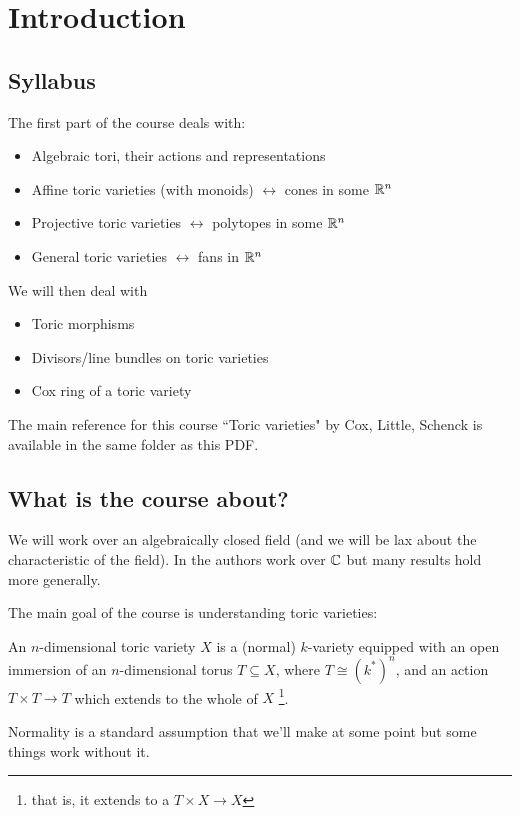 \chapter*{Introduction}
\section*{Syllabus}
The first part of the course deals with:
\begin{itemize}
    \item Algebraic tori, their actions and representations
    \item Affine toric varieties (with monoids) $\leftrightarrow$ cones in some $\mathbb{R}^n$
    \item Projective toric varieties $\leftrightarrow$ polytopes in some $\mathbb{R}^n$
    \item General toric varieties $\leftrightarrow$ fans in $\mathbb{R}^n$
\end{itemize}
We will then deal with
\begin{itemize}
    \item Toric morphisms 
    \item Divisors/line bundles on toric varieties
    \item Cox ring of a toric variety
\end{itemize}
The main reference for this course \textemdash ``Toric varieties" by Cox, Little, Schenck \cite{cox2011toric} \textemdash is available in the same folder as this PDF.

\section*{What is the course about?}
We will work over an algebraically closed field (and we will be lax about the characteristic of the field). In \cite{cox2011toric} the authors work over $\mathbb{C}$ but many results hold more generally.
\medskip

The main goal of the course is understanding toric varieties:
\begin{definition}
An $n$-dimensional toric variety $X$ is a (normal) $k$-variety equipped with an open immersion of an $n$-dimensional torus $T\subseteq X$, where $T\cong (k^\ast)^n$, and an action $T\times T\to T$ which extends to the whole of $X$ \footnote{that is, it extends to a $T\times X\to X$}.
\end{definition}

\begin{remark}
Normality is a standard assumption that we'll make at some point but some things work without it.
\end{remark}

